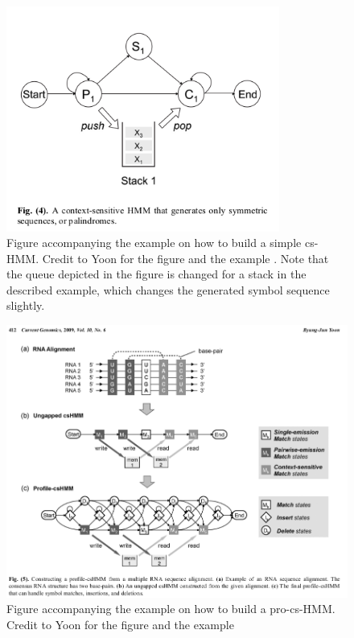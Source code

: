 \documentclass{article}\usepackage[]{graphicx}\usepackage[]{color}
\begin{document}
\begin{figure}[h]
    \centering
    \includegraphics[width = 0.8\textwidth]{ExampleYooncsHMM.png}
    \caption{Figure accompanying the example on how to build a simple cs-HMM. Credit to Yoon for the figure and the example \cite{Yoon2009}. Note that the queue depicted in the figure is changed for a stack in the described example, which changes the generated symbol sequence slightly.}
    \label{fig:Yoon2009ContextSensitiveHMMExample}
\end{figure}

\begin{figure}[h]
    \centering
    \includegraphics[width = \textwidth]{contextSensHMMExampleYoon.png}
    \caption{Figure accompanying the example on how to build a pro-cs-HMM. Credit to Yoon for the figure and the example \cite{Yoon2009}}
    \label{fig:Yoon2009ProfileContextSensitiveHMMExample}
\end{figure}
\end{document}

